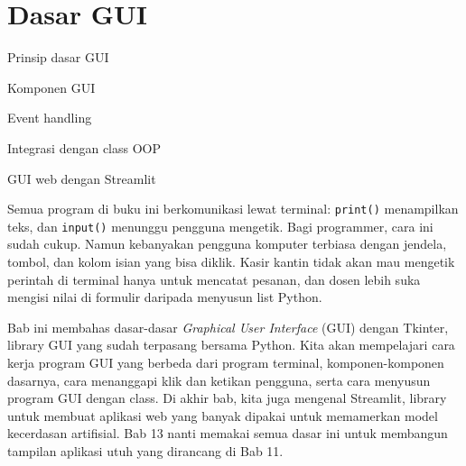\chapter{Dasar GUI}

\newcommand{\jendelaGUI}[5]{%
  \filldraw[fill=white,draw=abu,line width=0.6pt] (#1,#2) rectangle ++(#3,-#4);
  \fill[gelap] (#1,#2) rectangle ++(#3,-0.55);
  \node[anchor=west,text=white,font=\sffamily\footnotesize,inner sep=0pt] at (#1+0.25,#2-0.275) {#5};
  \fill[merah] (#1+#3-0.3,#2-0.275) circle (0.09);
  \fill[abu!70] (#1+#3-0.6,#2-0.275) circle (0.09);
  \fill[abu!70] (#1+#3-0.9,#2-0.275) circle (0.09);
}

\begin{dibabini}
  \item Prinsip dasar GUI
  \item Komponen GUI
  \item Event handling
  \item Integrasi dengan class OOP
  \item GUI web dengan Streamlit
\end{dibabini}

Semua program di buku ini berkomunikasi lewat terminal: \texttt{print()} menampilkan teks, dan \texttt{input()} menunggu pengguna mengetik. Bagi programmer, cara ini sudah cukup. Namun kebanyakan pengguna komputer terbiasa dengan jendela, tombol, dan kolom isian yang bisa diklik. Kasir kantin tidak akan mau mengetik perintah di terminal hanya untuk mencatat pesanan, dan dosen lebih suka mengisi nilai di formulir daripada menyusun list Python.

Bab ini membahas dasar-dasar \emph{Graphical User Interface} (GUI) dengan Tkinter, library GUI yang sudah terpasang bersama Python. Kita akan mempelajari cara kerja program GUI yang berbeda dari program terminal, komponen-komponen dasarnya, cara menanggapi klik dan ketikan pengguna, serta cara menyusun program GUI dengan class. Di akhir bab, kita juga mengenal Streamlit, library untuk membuat aplikasi web yang banyak dipakai untuk memamerkan model kecerdasan artifisial. Bab 13 nanti memakai semua dasar ini untuk membangun tampilan aplikasi utuh yang dirancang di Bab 11.

